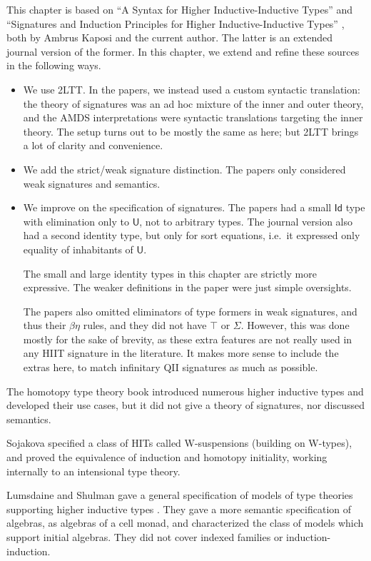 \documentclass[12pt,a4paper,twoside,openany]{book}
\theoremstyle{remark}
\theoremstyle{definition}
\theoremstyle{theorem}
\newcommand{\U}{\mathsf{U}}
\newcommand{\Id}{\mathsf{Id}}
\begin{document}
This chapter is based on ``A Syntax for Higher Inductive-Inductive Types''
\cite{hiit} and ``Signatures and Induction Principles for Higher
Inductive-Inductive Types'' \cite{hiits}, both by Ambrus Kaposi and the current
author. The latter is an extended journal version of the former. In this
chapter, we extend and refine these sources in the following ways.
\begin{itemize}
\item
    We use 2LTT. In the papers, we instead used a custom syntactic translation:
    the theory of signatures was an ad hoc mixture of the inner and outer
    theory, and the AMDS interpretations were syntactic translations targeting
    the inner theory. The setup turns out to be mostly the same as here; but
    2LTT brings a lot of clarity and convenience.
\item
    We add the strict/weak signature distinction. The papers only considered
    weak signatures and semantics.
\item
    We improve on the specification of signatures. The papers had a small $\Id$
    type with elimination only to $\U$, not to arbitrary types. The journal
    version also had a second identity type, but only for sort equations,
    i.e.\ it expressed only equality of inhabitants of $\U$.

    The small and large identity types in this chapter are strictly more
    expressive. The weaker definitions in the paper were just simple oversights.

    The papers also omitted eliminators of type formers in weak signatures, and
    thus their $\beta\eta$ rules, and they did not have $\top$ or
    $\Sigma$. However, this was done mostly for the sake of brevity, as these
    extra features are not really used in any HIIT signature in the literature.
    It makes more sense to include the extras here, to match infinitary QII
    signatures as much as possible.
\end{itemize}

The homotopy type theory book \cite{hottbook} introduced numerous higher
inductive types and developed their use cases, but it did not give a theory of
signatures, nor discussed semantics.

Sojakova \cite{sojakova} specified a class of HITs called W-suspensions
(building on W-types), and proved the equivalence of induction and homotopy
initiality, working internally to an intensional type theory.

Lumsdaine and Shulman gave a general specification of models of type theories
supporting higher inductive types \cite{lumsdaineShulman}. They gave a more
semantic specification of algebras, as algebras of a cell monad, and
characterized the class of models which support initial algebras. They did not
cover indexed families or induction-induction.
\end{document}
